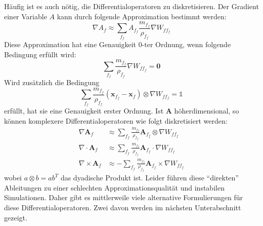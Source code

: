 \documentclass[11pt,
a4paper,
parskip=half, %
BCOR=10mm, %
english,
ngerman]{scrreprt}
\begin{document}
Häufig ist es auch nötig, die Differentialoperatoren zu diskretisieren.
Der Gradient einer Variable $A$ kann durch folgende Approximation bestimmt werden:
\begin{equation}
    \nabla A_f \approx \sum_{f_f} A_{f_f} \frac{m_{f_f}}{\rho_{f_f}} \nabla W_{ff_f}
\end{equation}
Diese Approximation hat eine Genauigkeit 0-ter Ordnung, wenn folgende Bedingung erfüllt wird:
\begin{equation}
    \sum_{f_f} \frac{m_{f_f}}{\rho_{f_f}} \nabla W_{ff_f} = \textbf{0}
\end{equation}
Wird zusätzlich die Bedingung
\begin{equation}
    \sum_{f_f} \frac{m_{f_f}}{\rho_{f_f}} (\textbf{x}_{f_f} - \textbf{x}_f) \otimes \nabla W_{ff_f} = \mathbb{1}
\end{equation}
erfüllt, hat sie eine Genauigkeit erster Ordnung.
Ist $\textbf{A}$ höherdimensional, so können komplexere Differentialoperatoren wie folgt diskretisiert werden:
\begin{align}
    \nabla \textbf{A}_f &\approx \sum_{f_f} \frac{m_{f_f}}{\rho_{f_f}} \textbf{A}_{f_f} \otimes \nabla W_{ff_f}\\
    \nabla \cdot \textbf{A}_f &\approx \sum_{f_f} \frac{m_{f_f}}{\rho_{f_f}} \textbf{A}_{f_f} \cdot \nabla W_{ff_f}\\
    \nabla \times \textbf{A}_f &\approx -\sum_{f_f} \frac{m_{f_f}}{\rho_{f_f}} \textbf{A}_{f_f} \times \nabla W_{ff_f}
\end{align}
wobei $a \otimes b = ab^T$ das dyadische Produkt ist.
Leider führen diese "`direkten"' Ableitungen zu einer schlechten Approximationsqualität und instabilen Simulationen.
Daher gibt es mittlerweile viele alternative Formulierungen für diese Differentialoperatoren.
Zwei davon werden im nächsten Unterabschnitt gezeigt.
\end{document}
